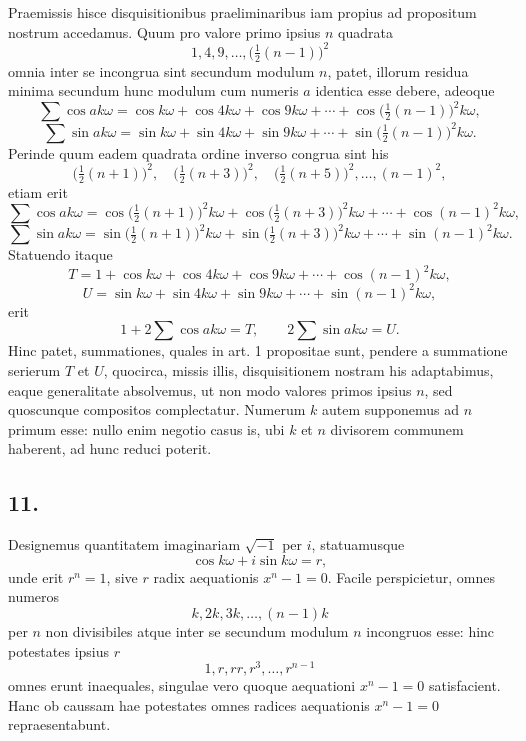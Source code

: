 \documentclass[12pt]{article}
\begin{document}
Praemissis hisce disquisitionibus praeliminaribus iam propius ad propositum nostrum accedamus. Quum pro valore primo ipsius $n$ quadrata
\[
1,4,9,\ldots,\bigl(\tfrac12(n-1)\bigr)^2
\]
omnia inter se incongrua sint secundum modulum $n$, patet, illorum residua minima secundum hunc modulum cum numeris $a$ identica esse debere, adeoque
\[
\sum\cos ak\omega=\cos k\omega+\cos4k\omega+\cos9k\omega+\cdots+
\cos\bigl(\tfrac12(n-1)\bigr)^2k\omega,
\]
\[
\sum\sin ak\omega=\sin k\omega+\sin4k\omega+\sin9k\omega+\cdots+
\sin\bigl(\tfrac12(n-1)\bigr)^2k\omega.
\]
Perinde quum eadem quadrata ordine inverso congrua sint his
\[
\bigl(\tfrac12(n+1)\bigr)^2,\quad
\bigl(\tfrac12(n+3)\bigr)^2,\quad
\bigl(\tfrac12(n+5)\bigr)^2,\ldots,(n-1)^2,
\]
etiam erit
\[
\sum\cos ak\omega=\cos\bigl(\tfrac12(n+1)\bigr)^2k\omega+
\cos\bigl(\tfrac12(n+3)\bigr)^2k\omega+\cdots+\cos(n-1)^2k\omega,
\]
\[
\sum\sin ak\omega=\sin\bigl(\tfrac12(n+1)\bigr)^2k\omega+
\sin\bigl(\tfrac12(n+3)\bigr)^2k\omega+\cdots+\sin(n-1)^2k\omega.
\]
Statuendo itaque
\[
T=1+\cos k\omega+\cos4k\omega+\cos9k\omega+\cdots+\cos(n-1)^2k\omega,
\]
\[
U=\sin k\omega+\sin4k\omega+\sin9k\omega+\cdots+\sin(n-1)^2k\omega,
\]
erit
\[
1+2\sum\cos ak\omega=T,\qquad 2\sum\sin ak\omega=U.
\]
Hinc patet, summationes, quales in art. 1 propositae sunt, pendere a summatione serierum $T$ et $U$, quocirca, missis illis, disquisitionem nostram his adaptabimus, eaque generalitate absolvemus, ut non modo valores primos ipsius $n$, sed quoscunque compositos complectatur. Numerum $k$ autem supponemus ad $n$ primum esse: nullo enim negotio casus is, ubi $k$ et $n$ divisorem communem haberent, ad hunc reduci poterit.

\subsection*{11.}

Designemus quantitatem imaginariam $\sqrt{-1}$ per $i$, statuamusque
\[
\cos k\omega+i\sin k\omega=r,
\]
unde erit $r^n=1$, sive $r$ radix aequationis $x^n-1=0$. Facile perspicietur, omnes numeros
\[
k,2k,3k,\ldots,(n-1)k
\]
per $n$ non divisibiles atque inter se secundum modulum $n$ incongruos esse: hinc potestates ipsius $r$
\[
1,r,rr,r^3,\ldots,r^{n-1}
\]
omnes erunt inaequales, singulae vero quoque aequationi $x^n-1=0$ satisfacient. Hanc ob caussam hae potestates omnes radices aequationis $x^n-1=0$ repraesentabunt.
\end{document}
